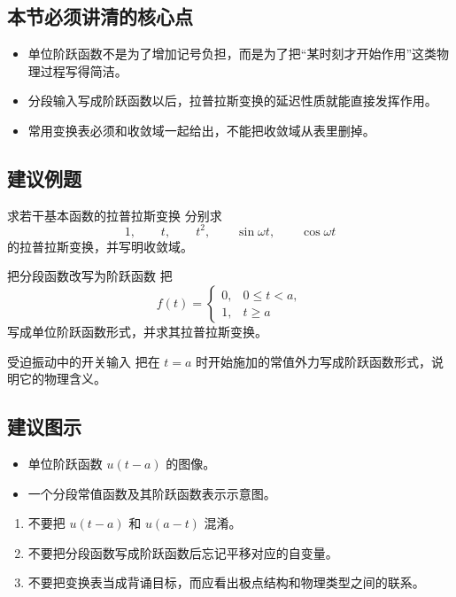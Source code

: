 \subsection*{本节必须讲清的核心点}
\begin{itemize}
    \item 单位阶跃函数不是为了增加记号负担，而是为了把``某时刻才开始作用''这类物理过程写得简洁。
    \item 分段输入写成阶跃函数以后，拉普拉斯变换的延迟性质就能直接发挥作用。
    \item 常用变换表必须和收敛域一起给出，不能把收敛域从表里删掉。
\end{itemize}

\subsection*{建议例题}
\begin{lizi}{求若干基本函数的拉普拉斯变换}{}
分别求
\[
    1,\qquad t,\qquad t^2,\qquad \sin\omega t,\qquad \cos\omega t
\]
的拉普拉斯变换，并写明收敛域。
\end{lizi}

\begin{lizi}{把分段函数改写为阶跃函数}{}
把
\[
    f(t)=
    \begin{cases}
        0, & 0\le t<a,\\
        1, & t\ge a
    \end{cases}
\]
写成单位阶跃函数形式，并求其拉普拉斯变换。
\end{lizi}

\begin{lizi}{受迫振动中的开关输入}{}
把在 $t=a$ 时开始施加的常值外力写成阶跃函数形式，说明它的物理含义。
\end{lizi}

\subsection*{建议图示}
\begin{itemize}
    \item 单位阶跃函数 $u(t-a)$ 的图像。
    \item 一个分段常值函数及其阶跃函数表示示意图。
\end{itemize}

\begin{jinshi}[本节易错点]
\begin{enumerate}
    \item 不要把 $u(t-a)$ 和 $u(a-t)$ 混淆。
    \item 不要把分段函数写成阶跃函数后忘记平移对应的自变量。
    \item 不要把变换表当成背诵目标，而应看出极点结构和物理类型之间的联系。
\end{enumerate}
\end{jinshi}

